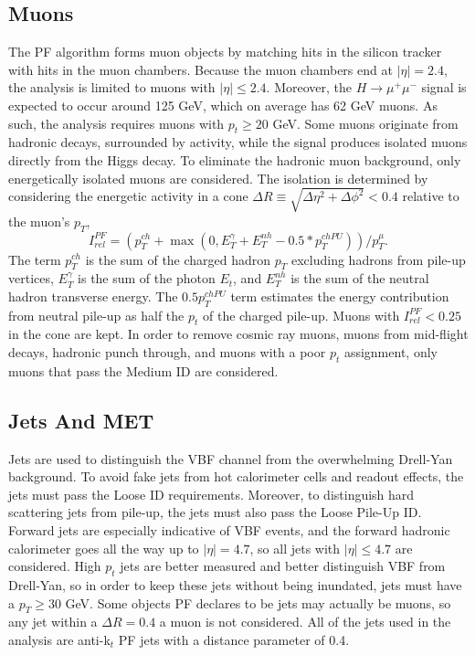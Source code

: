 \subsection{Muons}
The PF algorithm forms muon objects by matching hits in the silicon tracker with hits in the muon chambers. Because the muon chambers end at $|\eta|=2.4$, the analysis is limited to muons with $|\eta| \leq 2.4$. Moreover, the $H\rightarrow\mu^+\mu^-$ signal is expected to occur around 125 GeV, which on average has 62 GeV muons. As such, the analysis requires muons with $p_t \geq 20$ GeV. Some muons originate from hadronic decays, surrounded by activity, while the signal produces isolated muons directly from the Higgs decay. To eliminate the hadronic muon background, only energetically isolated muons are considered. The isolation is determined by considering the energetic activity in a cone $\Delta R\equiv\sqrt{\Delta\eta^{2}+\Delta\phi^{2}}<0.4$ relative to the muon's $p_T$,
\begin{equation}
I_{rel}^{PF}=(p_{T}^{ch}+\max(0,E_{T}^{\gamma}+E_{T}^{nh}-0.5*p_{T}^{chPU}))/p_{T}^{\mu}.
\end{equation}
The term $p_{T}^{ch}$ is the sum of the charged hadron $p_T$ excluding hadrons from pile-up vertices,
$E_{T}^{\gamma}$ is the sum of the photon $E_t$, and $E_{T}^{nh}$ is the sum of the neutral hadron transverse
energy. The $0.5p_{T}^{chPU}$ term estimates the energy contribution from neutral pile-up as half the $p_t$ of the charged pile-up.
Muons with $I_{rel}^{PF} < 0.25$ in the cone are kept. In order to remove cosmic ray muons, muons from mid-flight decays, hadronic punch through, and muons with a poor $p_t$ assignment, only muons that pass the Medium ID are considered. 

\subsection{Jets And MET}
Jets are used to distinguish the VBF channel from the overwhelming Drell-Yan background. To avoid fake jets from hot calorimeter cells and readout effects, the jets must pass the Loose ID requirements. Moreover, to distinguish hard scattering jets from pile-up, the jets must also pass the Loose Pile-Up ID. Forward jets are especially indicative of VBF events, and the forward hadronic calorimeter goes all the way up to $|\eta| = 4.7$, so all jets with $|\eta| \leq 4.7$ are considered. High $p_t$ jets are better measured and better distinguish VBF from Drell-Yan, so in order to keep these jets without being inundated, jets must have a $p_T \geq 30$ GeV. Some objects PF declares to be jets may actually be muons, so any jet within a $\Delta R = 0.4$ a muon is not considered. All of the jets used in the analysis are anti-k$_t$ PF jets with a distance parameter of 0.4. 

